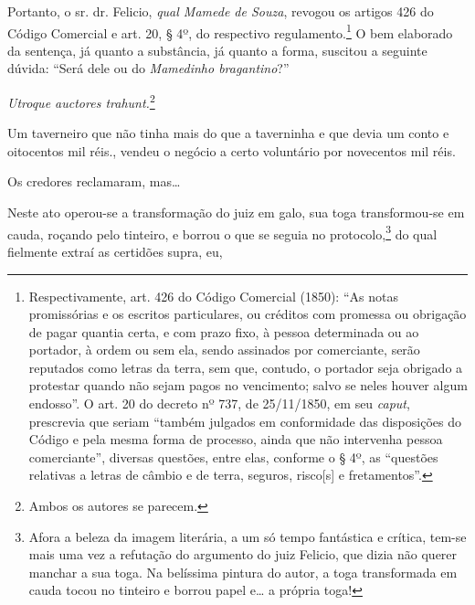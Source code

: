 {Portanto, o sr. dr. Felicio, \emph{qual Mamede de Souza}, revogou os
artigos 426 do Código Comercial e art. 20, § 4º, do respectivo
regulamento.\footnote{ Respectivamente, art. 426 do Código Comercial
  (1850): ``As notas promissórias e os escritos particulares, ou créditos
  com promessa ou obrigação de pagar quantia certa, e com prazo fixo, à
  pessoa determinada ou ao portador, à ordem ou sem ela, sendo assinados
  por comerciante, serão reputados como letras da terra, sem que,
  contudo, o portador seja obrigado a protestar quando não sejam pagos
  no vencimento; salvo se neles houver algum endosso''. O art. 20 do
  decreto nº 737, de 25/11/1850, em seu \emph{caput}, prescrevia que
  seriam ``também julgados em conformidade das dis­posições do Código e
  pela mesma forma de processo, ainda que não intervenha pessoa
  comerciante'', diversas questões, entre elas, conforme o § 4º, as
  ``questões relativas a letras de câmbio e de terra, seguros,
  risco{[}s{]} e fretamentos''.} O bem elaborado da sentença, já quanto a
substância, já quanto a forma, suscitou a seguinte dúvida: ``Será dele ou
do \emph{Mamedinho bragantino}?''

\emph{Utroque auctores trahunt.}\footnote{ Ambos os autores se parecem.}

\asterisc{}

Um taverneiro que não tinha mais do que a taverninha e que devia um
conto e oitocentos mil réis., vendeu o negócio a certo voluntário por
novecentos mil réis.

Os credores reclamaram, mas\ldots{}

Neste ato operou-se a transformação do juiz em galo, sua toga
transformou-se em cauda, roçando pelo tinteiro, e borrou o que se seguia
no protocolo,\footnote{ Afora a beleza da imagem literária, a um só
  tempo fantástica e crítica, tem-se mais uma vez a refutação do
  argumento do juiz Felicio, que dizia não querer manchar a sua toga. Na
  belíssima pintura do autor, a toga transformada em cauda tocou no
  tinteiro e borrou papel e\ldots{} a própria toga!} do qual fielmente extraí
as certidões supra, eu,

}

